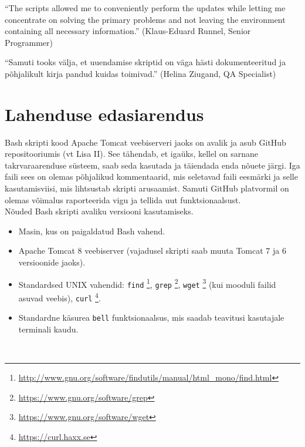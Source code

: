 \documentclass[12pt]{report}
\newcommand{\code}[1]{\texttt{#1}}
\begin{document}
    \begin{displayquote}
    ``The scripts allowed me to conveniently perform the updates while letting me concentrate on solving the primary problems and not leaving the environment containing all necessary information.'' (Klaus-Eduard Runnel, Senior Programmer)
    \end{displayquote}
    
    \begin{displayquote}
    ``Samuti tooks välja, et uuendamise skriptid on väga hästi dokumenteeritud ja põhjalikult kirja pandud kuidas toimivad.'' (Helina Ziugand, QA Specialist)
    \end{displayquote}

  \newpage
  
  \section{Lahenduse edasiarendus}
  
  Bash skripti kood Apache Tomcat veebiserveri jaoks on avalik ja asub GitHub repositooriumis (vt Lisa II). See tähendab, et igaüks, kellel on sarnane takrvaraarenduse süsteem, saab seda kasutada ja täiendada enda nõuete järgi. Iga faili sees on olemas põhjalikud kommentaarid, mis seletavad faili eesmärki ja selle kasutamisviisi, mis lihtsustab skripti arusaamist. Samuti GitHub platvormil on olemas võimalus raporteerida vigu ja tellida uut funktsionaalsust.\\
  
  Nõuded Bash skripti avaliku versiooni kasutamiseks.
  \begin{itemize}
    \item Masin, kus on paigaldatud Bash vahend.
    \item Apache Tomcat 8 veebiserver (vajadusel skripti saab muuta Tomcat 7 ja 6 versioonide jaoks).
    \item Standardsed UNIX vahendid: \code{find} \footnote{\url{http://www.gnu.org/software/findutils/manual/html_mono/find.html}}, \code{grep} \footnote{\url{https://www.gnu.org/software/grep}}, \code{wget} \footnote{\url{https://www.gnu.org/software/wget}} (kui mooduli failid asuvad veebis), \code{curl} \footnote{\url{https://curl.haxx.se}}.
    \item Standardne käsurea \code{bell} funktsionaalsus, mis saadab teavitusi kasutajale terminali kaudu.
  \end{itemize}\\
  
\end{document}
